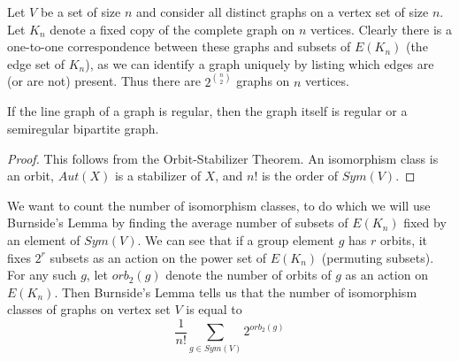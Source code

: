 










Let $V$ be a set of size $n$ and consider all distinct graphs on a vertex set of size $n$.  Let $K_n$ denote a fixed copy of the complete graph on $n$ vertices.  Clearly there is a one-to-one correspondence between these graphs and subsets of $E(K_n)$ (the edge set of $K_n$), as we can identify a graph uniquely by listing which edges are (or are not) present.  Thus there are $2^{\binom{n}{2}}$ graphs on $n$ vertices.





\begin{lemma}
	{If the line graph of a graph is regular, then the graph itself is regular or a semiregular bipartite graph.}
\end{lemma}






\begin{proof}
	This follows from the Orbit-Stabilizer Theorem.  An isomorphism class is an orbit, $Aut(X)$ is a stabilizer of $X$, and $n!$ is the order of $Sym(V)$.
\end{proof}



We want to count the number of isomorphism classes, to do which we will use Burnside's Lemma by finding the average number of subsets of $E(K_n)$ fixed by an element of $Sym(V)$.  We can see that if a group element $g$ has $r$ orbits, it fixes $2^r$ subsets as an action on the power set of $E(K_n)$ (permuting subsets).  For any such $g$, let $orb_2(g)$ denote the number of orbits of $g$ as an action on $E(K_n)$.  Then Burnside's Lemma tells us that the number of isomorphism classes of graphs on vertex set $V$ is equal to $$\frac{1}{n!}\sum\limits_{g\in Sym(V)} 2^{orb_2(g)}$$

